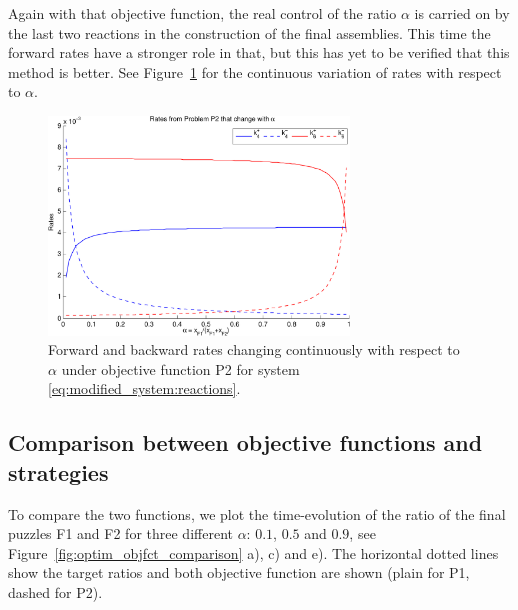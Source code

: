 	Again with that objective function, the real control of the ratio $\alpha$ is carried on by the last two reactions in the construction of the final assemblies. This time the forward rates have a stronger role in that, but this has yet to be verified that this method is better. See Figure~\ref{fig:img_optimized_rates_alpha_p2} for the continuous variation of rates with respect to $\alpha$.
	
	\begin{figure}[h!]
		\centering
			\includegraphics[width=8cm]{img/optimized_rates_alpha_p2.pdf}
		\caption{Forward and backward rates changing continuously with respect to $\alpha$ under objective function P2 for system \eqref{eq:modified_system:reactions}.}
		\label{fig:img_optimized_rates_alpha_p2}
	\end{figure}
	
	\subsection{Comparison between objective functions and strategies} %
	\label{sub:comparison_between_objective_functions_and_strategies}
	
		To compare the two functions, we plot the time-evolution of the ratio of the final puzzles F1 and F2 for three different $\alpha$: $0.1$, $0.5$ and $0.9$, see Figure~\ref{fig:optim_objfct_comparison} a), c) and e). The horizontal dotted lines show the target ratios and both objective function are shown (plain for P1, dashed for P2).
	
